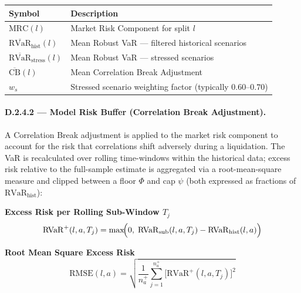 \documentclass[9pt, a4paper]{extarticle}
\newenvironment{formulabox}{\par\addvspace{4pt}}{\par\addvspace{4pt}}
\newcommand{\vartableheader}{%
    \textbf{Symbol} & \textbf{Description}\\
}
\begin{document}
\begin{tabularx}{\linewidth}{lX}
\toprule
\vartableheader
\midrule
$\mathrm{MRC}(l)$                                    & Market Risk Component for split $l$ \\
$\overline{\mathrm{RVaR}}_{\mathrm{hist}}(l)$        & Mean Robust VaR — filtered historical scenarios \\
$\overline{\mathrm{RVaR}}_{\mathrm{stress}}(l)$      & Mean Robust VaR — stressed scenarios \\
$\overline{\mathrm{CB}}(l)$                          & Mean Correlation Break Adjustment \\
$w_s$                                                & Stressed scenario weighting factor (typically $0.60$–$0.70$) \\
\bottomrule
\end{tabularx}

\newpage

\paragraph{D.2.4.2 — Model Risk Buffer (Correlation Break Adjustment).}

A Correlation Break adjustment is applied to the market risk component to
account for the risk that correlations shift adversely during a liquidation.
The VaR is recalculated over rolling time-windows within the historical data;
excess risk relative to the full-sample estimate is aggregated via a
root-mean-square measure and clipped between a floor $\Phi$ and cap $\psi$
(both expressed as fractions of $\mathrm{RVaR}_{\mathrm{hist}}$):

\begin{formulabox}
\textbf{Excess Risk per Rolling Sub-Window $T_j$}
\begin{equation*}
    \mathrm{RVaR}^{+}(l,a,T_j) =
        \max\!\Bigl(0,\;
            \mathrm{RVaR}_{\mathrm{sub}}(l,a,T_j)
            - \mathrm{RVaR}_{\mathrm{hist}}(l,a)
        \Bigr)
\end{equation*}
\end{formulabox}

\begin{formulabox}
\textbf{Root Mean Square Excess Risk}
\begin{equation*}
    \mathrm{RMSE}(l,a) =
        \sqrt{\frac{1}{n^{+}_a}
              \sum_{j=1}^{n^{+}_a}
              \bigl[\mathrm{RVaR}^{+}(l,a,T_j)\bigr]^{2}}
\end{equation*}
\end{formulabox}
\end{document}
